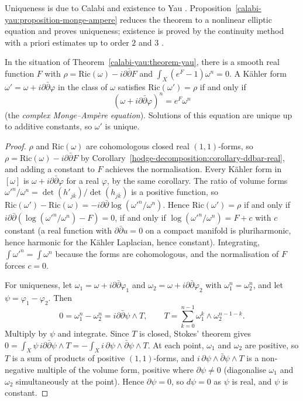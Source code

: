Uniqueness is due to Calabi and existence to Yau \cite{yau-1978}. Proposition~\ref{calabi-yau:proposition-monge-ampere} reduces the theorem to a nonlinear elliptic
equation and proves uniqueness; existence is proved by the continuity method with a priori estimates up to order $2$ and $3$ \cite[Chapter 5]{joyce-special-holonomy}.

\begin{proposition}\label{calabi-yau:proposition-monge-ampere}
In the situation of Theorem~\ref{calabi-yau:theorem-yau}, there is a smooth real function $F$ with $\rho = \mathrm{Ric}(\omega) - i\partial\bar\partial F$ and
$\int_X(e^F - 1)\omega^n = 0$. A K\"ahler form $\omega' = \omega + i\partial\bar\partial\varphi$ in the class of $\omega$ satisfies $\mathrm{Ric}(\omega') = \rho$ if and only if
\[
(\omega + i\partial\bar\partial\varphi)^n = e^F\omega^n
\]
(the \emph{complex Monge--Amp\`ere equation}). Solutions of this equation are unique up to additive constants, so $\omega'$ is unique.
\end{proposition}

\begin{proof}
$\rho$ and $\mathrm{Ric}(\omega)$ are cohomologous closed real $(1,1)$-forms, so $\rho = \mathrm{Ric}(\omega) - i\partial\bar\partial F$ by
Corollary~\ref{hodge-decomposition:corollary-ddbar-real}, and adding a constant to $F$ achieves the normalisation. Every K\"ahler form in $[\omega]$ is
$\omega + i\partial\bar\partial\varphi$ for a real $\varphi$, by the same corollary. The ratio of volume forms $\omega'^n/\omega^n = \det(h'_{j\bar k})/\det(h_{j\bar k})$ is a
positive function, so $\mathrm{Ric}(\omega') - \mathrm{Ric}(\omega) = -i\partial\bar\partial\log(\omega'^n/\omega^n)$. Hence $\mathrm{Ric}(\omega') = \rho$ if and only if
$i\partial\bar\partial(\log(\omega'^n/\omega^n) - F) = 0$, if and only if $\log(\omega'^n/\omega^n) = F + c$ with $c$ constant (a real function with $\partial\bar\partial u = 0$
on a compact manifold is pluriharmonic, hence harmonic for the K\"ahler Laplacian, hence constant). Integrating, $\int\omega'^n = \int\omega^n$ because the forms are cohomologous,
and the normalisation of $F$ forces $c = 0$.

For uniqueness, let $\omega_1 = \omega + i\partial\bar\partial\varphi_1$ and $\omega_2 = \omega + i\partial\bar\partial\varphi_2$ with $\omega_1^n = \omega_2^n$, and let $\psi = \varphi_1 - \varphi_2$. Then
\[
0 = \omega_1^n - \omega_2^n = i\partial\bar\partial\psi \wedge T, \qquad T = \sum_{k=0}^{n-1}\omega_1^k \wedge \omega_2^{n-1-k} .
\]
Multiply by $\psi$ and integrate. Since $T$ is closed, Stokes' theorem gives
$0 = \int_X\psi\,i\partial\bar\partial\psi \wedge T = -\int_Xi\,\partial\psi \wedge \bar\partial\psi \wedge T$. At each point, $\omega_1$ and $\omega_2$ are positive, so $T$ is a sum of
products of positive $(1,1)$-forms, and $i\,\partial\psi \wedge \bar\partial\psi \wedge T$ is a non-negative multiple of the volume form, positive where $\partial\psi \neq 0$ (diagonalise
$\omega_1$ and $\omega_2$ simultaneously at the point). Hence $\partial\psi = 0$, so $d\psi = 0$ as $\psi$ is real, and $\psi$ is constant.
\end{proof}

